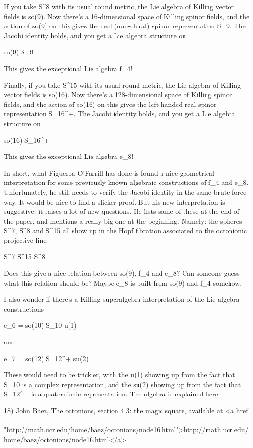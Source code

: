 If you take S^{8} with its usual round metric, the Lie algebra
of Killing vector fields is so(9).  Now there's a 16-dimensional space
of Killing spinor fields, and the action of so(9) on this gives the
real (non-chiral) spinor representation S_{9}.  The Jacobi
identity holds, and you get a Lie algebra structure on

so(9) \oplus  S_{9}

This gives the exceptional Lie algebra f_{4}!

Finally, if you take S^{15} with its usual round metric, the Lie 
algebra of Killing vector fields is so(16).  Now there's a 
128-dimensional space of Killing spinor fields, and the action of 
so(16) on this gives the left-handed real spinor representation 
S_{16}^{+}.  The Jacobi identity holds, and you 
get a Lie algebra structure on

so(16) \oplus  S_{16}^{+}

This gives the exceptional Lie algebra e_{8}!

In short, what Figueroa-O'Farrill has done is found a nice geometrical
interpretation for some previously known algebraic constructions of
f_{4} and e_{8}.  Unfortunately, he still needs to
verify the Jacobi identity in the same brute-force way.  It would be
nice to find a slicker proof.  But his new interpretation is
suggestive: it raises a lot of new questions.  He lists some of these
at the end of the paper, and mentions a really big one at the
beginning.  Namely: the spheres S^{7}, S^{8} and
S^{15} all show up in the Hopf fibration associated to the
octonionic projective line:

S^{7} \to  S^{15} \to  S^{8}

Does this give a nice relation between so(9), f_{4} and
e_{8}?  Can someone guess what this relation should be?  Maybe
e_{8} is built from so(9) and f_{4} somehow.

I also wonder if there's a Killing superalgebra interpretation
of the Lie algebra constructions

e_{6} = so(10) \oplus  S_{10} \oplus  u(1)

and

e_{7} = so(12) \oplus  S_{12}^{+} \oplus  su(2)

These would need to be trickier, with the u(1) showing up from
the fact that S_{10} is a complex representation, and the su(2)
showing up from the fact that S_{12}^{+} is a quaternionic 
representation.  The algebra is explained here:

18) John Baez, The octonions, section 4.3: the magic square,
available at <a href = "http://math.ucr.edu/home/baez/octonions/node16.html">http://math.ucr.edu/home/baez/octonions/node16.html</a>

